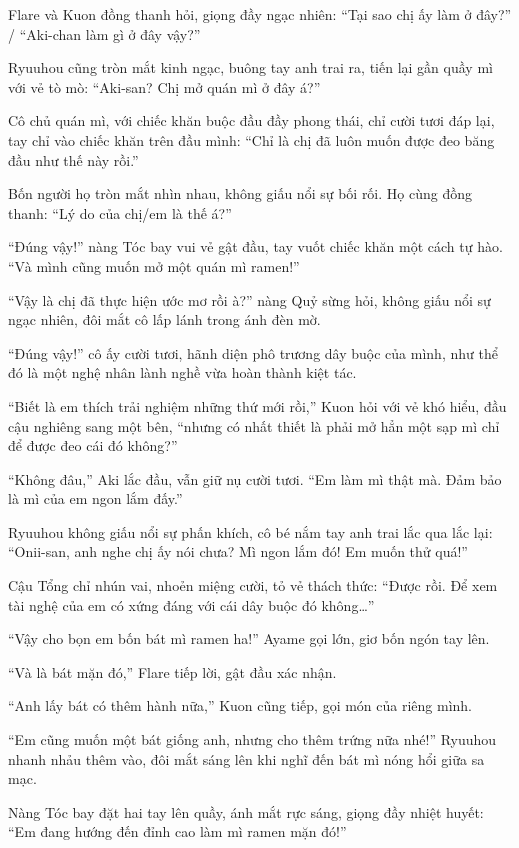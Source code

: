 \documentclass[../main.tex]{subfiles}
\begin{document}

Flare và Kuon đồng thanh hỏi, giọng đầy ngạc nhiên: ``Tại sao chị ấy làm ở đây?'' / ``Aki-chan làm gì ở đây vậy?''

Ryuuhou cũng tròn mắt kinh ngạc, buông tay anh trai ra, tiến lại gần quầy mì với vẻ tò mò: ``Aki-san? Chị mở quán mì ở đây á?''

Cô chủ quán mì, với chiếc khăn buộc đầu đầy phong thái, chỉ cười tươi đáp lại, tay chỉ vào chiếc khăn trên đầu mình: ``Chỉ là chị đã luôn muốn được đeo băng đầu như thế này rồi.''

Bốn người họ tròn mắt nhìn nhau, không giấu nổi sự bối rối. Họ cùng đồng thanh: ``Lý do của chị/em là thế á?''

``Đúng vậy!'' nàng Tóc bay vui vẻ gật đầu, tay vuốt chiếc khăn một cách tự hào. ``Và mình cũng muốn mở một quán mì ramen!''

``Vậy là chị đã thực hiện ước mơ rồi à?'' nàng Quỷ sừng hỏi, không giấu nổi sự ngạc nhiên, đôi mắt cô lấp lánh trong ánh đèn mờ.

``Đúng vậy!'' cô ấy cười tươi, hãnh diện phô trương dây buộc của mình, như thể đó là một nghệ nhân lành nghề vừa hoàn thành kiệt tác.

``Biết là em thích trải nghiệm những thứ mới rồi,'' Kuon hỏi với vẻ khó hiểu, đầu cậu nghiêng sang một bên, ``nhưng có nhất thiết là phải mở hẳn một sạp mì chỉ để được đeo cái đó không?''

``Không đâu,'' Aki lắc đầu, vẫn giữ nụ cười tươi. ``Em làm mì thật mà. Đảm bảo là mì của em ngon lắm đấy.''

Ryuuhou không giấu nổi sự phấn khích, cô bé nắm tay anh trai lắc qua lắc lại: ``Onii-san, anh nghe chị ấy nói chưa? Mì ngon lắm đó! Em muốn thử quá!''

Cậu Tổng chỉ nhún vai, nhoẻn miệng cười, tỏ vẻ thách thức: ``Được rồi. Để xem tài nghệ của em có xứng đáng với cái dây buộc đó không\dots''

``Vậy cho bọn em bốn bát mì ramen ha!'' Ayame gọi lớn, giơ bốn ngón tay lên.

``Và là bát mặn đó,'' Flare tiếp lời, gật đầu xác nhận.

``Anh lấy bát có thêm hành nữa,'' Kuon cũng tiếp, gọi món của riêng mình.

``Em cũng muốn một bát giống anh, nhưng cho thêm trứng nữa nhé!'' Ryuuhou nhanh nhảu thêm vào, đôi mắt sáng lên khi nghĩ đến bát mì nóng hổi giữa sa mạc.

Nàng Tóc bay đặt hai tay lên quầy, ánh mắt rực sáng, giọng đầy nhiệt huyết: ``Em đang hướng đến đỉnh cao làm mì ramen mặn đó!''
\end{document}
